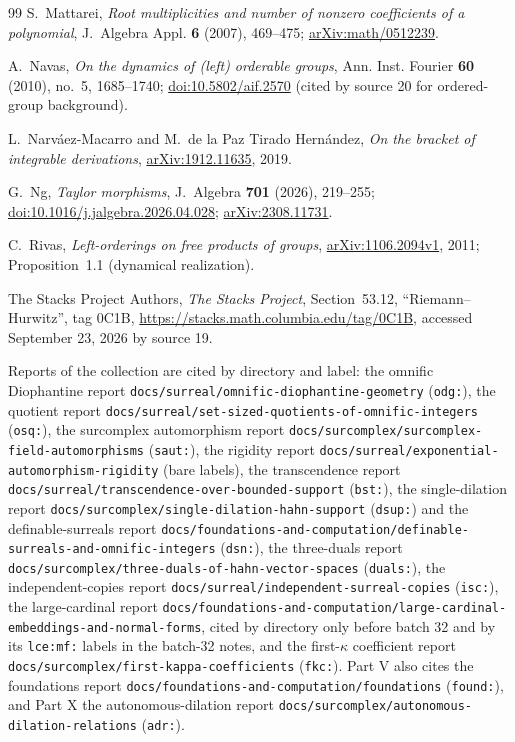 \documentclass[11pt,oneside]{article}
\numberwithin{equation}{section}
\theoremstyle{definition}
\theoremstyle{remark}
\newcommand{\lbl}[1]{\nolinkurl{#1}}
\newcommand{\fn}[1]{\nolinkurl{#1}}
\begin{document}
\begin{thebibliography}{99}
S.~Mattarei, \emph{Root multiplicities and number of nonzero coefficients of a polynomial},
J.~Algebra Appl. \textbf{6} (2007), 469--475;
\href{https://arxiv.org/abs/math/0512239}{arXiv:math/0512239}.

A.~Navas, \emph{On the dynamics of (left) orderable groups}, Ann. Inst. Fourier \textbf{60} (2010), no.~5, 1685--1740;
\href{https://doi.org/10.5802/aif.2570}{doi:10.5802/aif.2570} (cited by source 20 for ordered-group background).

L.~Narv\'aez-Macarro and M.~de la Paz Tirado Hern\'andez, \emph{On the bracket of integrable derivations},
\href{https://arxiv.org/abs/1912.11635}{arXiv:1912.11635}, 2019.

G.~Ng, \emph{Taylor morphisms}, J.~Algebra \textbf{701} (2026), 219--255;
\href{https://doi.org/10.1016/j.jalgebra.2026.04.028}{doi:10.1016/j.jalgebra.2026.04.028};
\href{https://arxiv.org/abs/2308.11731}{arXiv:2308.11731}.

C.~Rivas, \emph{Left-orderings on free products of groups},
\href{https://arxiv.org/abs/1106.2094}{arXiv:1106.2094v1}, 2011; Proposition~1.1 (dynamical realization).

The Stacks Project Authors, \emph{The Stacks Project}, Section~53.12, ``Riemann--Hurwitz'', tag 0C1B,
\url{https://stacks.math.columbia.edu/tag/0C1B}, accessed September 23, 2026 by source 19.

\end{thebibliography}

Reports of the collection are cited by directory and label: the omnific Diophantine
report \fn{docs/surreal/omnific-diophantine-geometry} (\lbl{odg:}), the quotient report
\fn{docs/surreal/set-sized-quotients-of-omnific-integers} (\lbl{osq:}), the surcomplex
automorphism report \fn{docs/surcomplex/surcomplex-field-automorphisms} (\lbl{saut:}),
the rigidity report \fn{docs/surreal/exponential-automorphism-rigidity} (bare labels),
the transcendence report \fn{docs/surreal/transcendence-over-bounded-support}
(\lbl{bst:}), the single-dilation report
\fn{docs/surcomplex/single-dilation-hahn-support} (\lbl{dsup:}) and the
definable-surreals report
\fn{docs/foundations-and-computation/definable-surreals-and-omnific-integers}
(\lbl{dsn:}), the three-duals report \fn{docs/surcomplex/three-duals-of-hahn-vector-spaces}
(\lbl{duals:}), the independent-copies report \fn{docs/surreal/independent-surreal-copies}
(\lbl{isc:}), the large-cardinal report
\fn{docs/foundations-and-computation/large-cardinal-embeddings-and-normal-forms}, cited by directory
only before batch 32 and by its \lbl{lce:mf:} labels in the batch-32 notes, and the first-$\kappa$ coefficient report
\fn{docs/surcomplex/first-kappa-coefficients} (\lbl{fkc:}). Part V also cites the foundations report \fn{docs/foundations-and-computation/foundations}
(\lbl{found:}), and Part X the autonomous-dilation report \fn{docs/surcomplex/autonomous-dilation-relations} (\lbl{adr:}).
\end{document}
